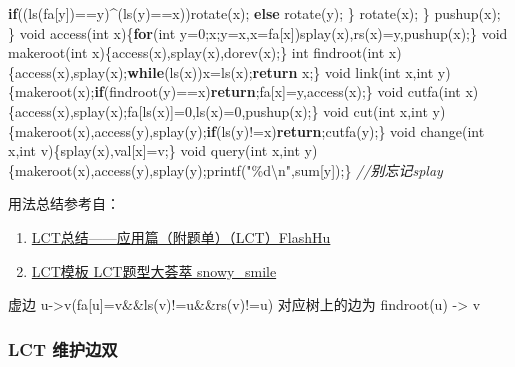 \documentclass[
]{article}
\newenvironment{Shaded}{}{}
\newcommand{\CommentTok}[1]{\textcolor[rgb]{0.38,0.63,0.69}{\textit{#1}}}
\newcommand{\ControlFlowTok}[1]{\textcolor[rgb]{0.00,0.44,0.13}{\textbf{#1}}}
\newcommand{\DataTypeTok}[1]{\textcolor[rgb]{0.56,0.13,0.00}{#1}}
\newcommand{\DecValTok}[1]{\textcolor[rgb]{0.25,0.63,0.44}{#1}}
\newcommand{\NormalTok}[1]{#1}
\newcommand{\SpecialCharTok}[1]{\textcolor[rgb]{0.25,0.44,0.63}{#1}}
\newcommand{\StringTok}[1]{\textcolor[rgb]{0.25,0.44,0.63}{#1}}
\begin{document}
\begin{Shaded}
\begin{Highlighting}[]
            \ControlFlowTok{if}\NormalTok{((ls(fa[y])==y)\^{}(ls(y)==x))rotate(x);}
            \ControlFlowTok{else}\NormalTok{ rotate(y);}
\NormalTok{        \}}
\NormalTok{        rotate(x);}
\NormalTok{    \}}
\NormalTok{    pushup(x);}
\NormalTok{\}}
\DataTypeTok{void}\NormalTok{ access(}\DataTypeTok{int}\NormalTok{ x)\{}\ControlFlowTok{for}\NormalTok{(}\DataTypeTok{int}\NormalTok{ y=}\DecValTok{0}\NormalTok{;x;y=x,x=fa[x])splay(x),rs(x)=y,pushup(x);\}}
\DataTypeTok{void}\NormalTok{ makeroot(}\DataTypeTok{int}\NormalTok{ x)\{access(x),splay(x),dorev(x);\}}
\DataTypeTok{int}\NormalTok{ findroot(}\DataTypeTok{int}\NormalTok{ x)\{access(x),splay(x);}\ControlFlowTok{while}\NormalTok{(ls(x))x=ls(x);}\ControlFlowTok{return}\NormalTok{ x;\}}
\DataTypeTok{void}\NormalTok{ link(}\DataTypeTok{int}\NormalTok{ x,}\DataTypeTok{int}\NormalTok{ y)\{makeroot(x);}\ControlFlowTok{if}\NormalTok{(findroot(y)==x)}\ControlFlowTok{return}\NormalTok{;fa[x]=y,access(x);\}}
\DataTypeTok{void}\NormalTok{ cutfa(}\DataTypeTok{int}\NormalTok{ x)\{access(x),splay(x);fa[ls(x)]=}\DecValTok{0}\NormalTok{,ls(x)=}\DecValTok{0}\NormalTok{,pushup(x);\}}
\DataTypeTok{void}\NormalTok{ cut(}\DataTypeTok{int}\NormalTok{ x,}\DataTypeTok{int}\NormalTok{ y)\{makeroot(x),access(y),splay(y);}\ControlFlowTok{if}\NormalTok{(ls(y)!=x)}\ControlFlowTok{return}\NormalTok{;cutfa(y);\}}
\DataTypeTok{void}\NormalTok{ change(}\DataTypeTok{int}\NormalTok{ x,}\DataTypeTok{int}\NormalTok{ v)\{splay(x),val[x]=v;\}}
\DataTypeTok{void}\NormalTok{ query(}\DataTypeTok{int}\NormalTok{ x,}\DataTypeTok{int}\NormalTok{ y)\{makeroot(x),access(y),splay(y);printf(}\StringTok{"}\SpecialCharTok{\%d\textbackslash{}n}\StringTok{"}\NormalTok{,sum[y]);\} }\CommentTok{//别忘记splay}
\end{Highlighting}
\end{Shaded}

用法总结参考自：

\begin{enumerate}
\def\labelenumi{\arabic{enumi}.}
\item
  \href{https://www.cnblogs.com/flashhu/p/9498517.html}{LCT总结------应用篇（附题单）（LCT）FlashHu}
\item
  \href{https://blog.csdn.net/snowy_smile/article/details/79120055}{LCT模板
  LCT题型大荟萃 snowy\_smile}
\end{enumerate}

虚边 u-\textgreater v(fa{[}u{]}=v\&\&ls(v)!=u\&\&rs(v)!=u)
对应树上的边为 findroot(u) -\textgreater{} v

\hypertarget{lct-ux7ef4ux62a4ux8fb9ux53cc}{%
\subsubsection{LCT 维护边双}\label{lct-ux7ef4ux62a4ux8fb9ux53cc}}
\end{document}
